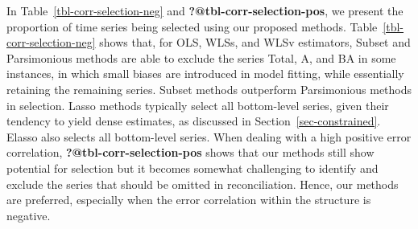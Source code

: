 \documentclass[
  11pt]{article}
\theoremstyle{plain}
\theoremstyle{remark}
\begin{document}
In Table~\ref{tbl-corr-selection-neg} and
\textbf{?@tbl-corr-selection-pos}, we present the proportion of time
series being selected using our proposed methods.
Table~\ref{tbl-corr-selection-neg} shows that, for OLS, WLSs, and WLSv
estimators, Subset and Parsimonious methods are able to exclude the
series Total, A, and BA in some instances, in which small biases are
introduced in model fitting, while essentially retaining the remaining
series. Subset methods outperform Parsimonious methods in selection.
Lasso methods typically select all bottom-level series, given their
tendency to yield dense estimates, as discussed in
Section~\ref{sec-constrained}. Elasso also selects all bottom-level
series. When dealing with a high positive error correlation,
\textbf{?@tbl-corr-selection-pos} shows that our methods still show
potential for selection but it becomes somewhat challenging to identify
and exclude the series that should be omitted in reconciliation. Hence,
our methods are preferred, especially when the error correlation within
the structure is negative.
\end{document}
